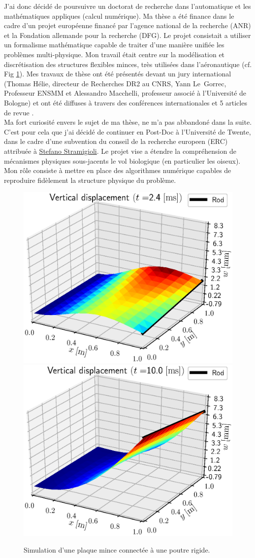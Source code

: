 \documentclass[french]{article}
\begin{document}
J'ai donc décidé de poursuivre un doctorat de recherche dans l'automatique et les mathématiques appliques (calcul numérique). Ma thèse a été finance dans le cadre d'un projet européenne financé par l'agence national de la recherche (ANR) et la Fondation allemande pour la recherche (DFG). Le projet consistait a utiliser un formalisme mathématique capable de traiter d'une manière unifiée les problèmes multi-physique. Mon travail était centre sur la modélisation et discrétisation des structures flexibles minces, très utilisées dans l'aéronautique (cf. Fig \ref{fig:IntRod}). Mes travaux de thèse ont été présentés devant un jury international (Thomas Hélie, directeur de Recherches DR2 au CNRS, Yann Le~Gorrec, Professeur ENSMM et Alessandro Macchelli, professeur associé \`a l'Universit\'e de Bologne) et ont été diffuses \`a travers des conférences internationales et 5 articles de revue \cite{brugnoli2019ammmin,brugnoli2019ammkir,brugnoli2020msd,brugnoli2021ther,brugnoli2021num}. \\

Ma fort curiosit\'e envers le sujet de ma thèse, ne m'a pas abbandon\'e dans la suite. C'est pour cela que j'ai décidé de continuer en Post-Doc \`a l'Universit\'e de Twente, dans le cadre d'une subvention du conseil de la recherche europeen (ERC) attribu\'ee \`a \href{https://people.utwente.nl/s.stramigioli?tab=about-me}{Stefano Stramigioli}. Le projet vise a étendre la compréhension de mécanismes physiques sous-jacents le vol biologique (en particulier les oiseux). Mon rôle consiste \`a mettre en place des algorithmes numérique capables de reproduire fidèlement la structure physique du problème.

\begin{figure}[hbt]
	\includegraphics[width=0.5\linewidth]{SnapRod_t25.eps}
	\includegraphics[width=0.5\linewidth]{SnapRod_t100.eps}
	\caption{Simulation d'une plaque mince connectée \`a une poutre rigide.}
	\label{fig:IntRod}
\end{figure}
\end{document}
